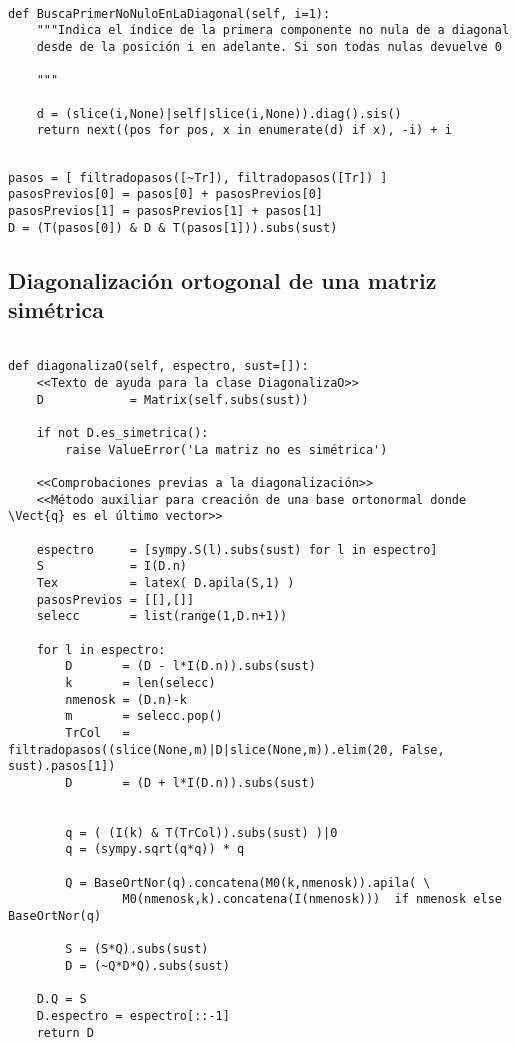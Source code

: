 \documentclass[11pt]{report}
\begin{document}
\begin{verbatim}

def BuscaPrimerNoNuloEnLaDiagonal(self, i=1):
    """Indica el índice de la primera componente no nula de a diagonal
    desde de la posición i en adelante. Si son todas nulas devuelve 0

    """
    
    d = (slice(i,None)|self|slice(i,None)).diag().sis()
    return next((pos for pos, x in enumerate(d) if x), -i) + i

\end{verbatim}


\begin{verbatim}

pasos = [ filtradopasos([~Tr]), filtradopasos([Tr]) ]
pasosPrevios[0] = pasos[0] + pasosPrevios[0]
pasosPrevios[1] = pasosPrevios[1] + pasos[1]
D = (T(pasos[0]) & D & T(pasos[1])).subs(sust)

\end{verbatim}


\subsection{Diagonalización ortogonal de una matriz simétrica}
\label{sec:org587f73a}

\begin{verbatim}

def diagonalizaO(self, espectro, sust=[]):
    <<Texto de ayuda para la clase DiagonalizaO>>
    D            = Matrix(self.subs(sust))
    
    if not D.es_simetrica():
        raise ValueError('La matriz no es simétrica')
    
    <<Comprobaciones previas a la diagonalización>>
    <<Método auxiliar para creación de una base ortonormal donde \Vect{q} es el último vector>>
    
    espectro     = [sympy.S(l).subs(sust) for l in espectro]    
    S            = I(D.n)
    Tex          = latex( D.apila(S,1) )
    pasosPrevios = [[],[]]
    selecc       = list(range(1,D.n+1))

    for l in espectro:
        D       = (D - l*I(D.n)).subs(sust)
        k       = len(selecc)
        nmenosk = (D.n)-k
        m       = selecc.pop()
        TrCol   = filtradopasos((slice(None,m)|D|slice(None,m)).elim(20, False, sust).pasos[1])
        D       = (D + l*I(D.n)).subs(sust)
        
        
        q = ( (I(k) & T(TrCol)).subs(sust) )|0
        q = (sympy.sqrt(q*q)) * q
        
        Q = BaseOrtNor(q).concatena(M0(k,nmenosk)).apila( \
                M0(nmenosk,k).concatena(I(nmenosk)))  if nmenosk else BaseOrtNor(q)
            
        S = (S*Q).subs(sust)
        D = (~Q*D*Q).subs(sust)

    D.Q = S
    D.espectro = espectro[::-1]
    return D

\end{verbatim}
\end{document}

